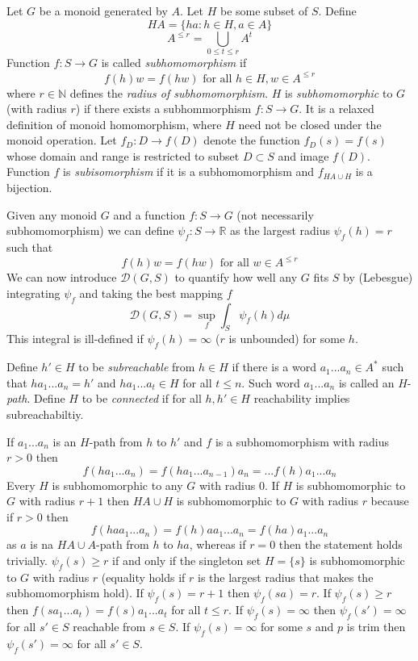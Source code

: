 \documentclass[12pt]{article}
\begin{document}
Let $G$ be a monoid generated by $A$. Let $H$ be some subset of $S$. Define 
\[
HA=\{ha:h\in H, a\in A\}
\]
\[
A^{\le r}=\bigcup_{0 \le t \le r} A^t
\]
Function $f:S \rightarrow G$ is called \textit{subhomomorphism} if 
\[
f(h)w=f(hw)\text{ for all }h\in H, w\in A^{\le r}
\]
where $r\in \mathbb{N}$ defines the \textit{radius of subhomomorphism}.
$H$ is \textit{subhomomorphic} to $G$ (with radius $r$) if there exists a subhommorphism $f:S \rightarrow G$. It is a relaxed definition of monoid homomorphism, where $H$ need not be closed under the monoid operation. Let $f_D:D\rightarrow f(D)$ denote the function $f_D(s)=f(s)$ whose domain and range is restricted to subset $D\subset S$ and image $f(D)$. 
Function $f$ is \textit{subisomorphism} if it is a subhomomorphism and $f_{HA \cup H}$ is a bijection. 


Given any monoid $G$ and a function $f:S\rightarrow G$ (not necessarily subhomomorphism) we can define $\psi_f:S \rightarrow \mathbb{R}$ as the largest radius $\psi_f(h)=r$ such that
\[
f(h)w=f(hw)\text{ for all } w\in A^{\le r}
\]
We can now introduce $\mathcal{D}(G,S)$ to quantify how well any $G$ fits $S$ by (Lebesgue) integrating $\psi_f$ and taking the best mapping $f$
\[
\mathcal{D}(G,S) = \sup_f \int_S \psi_f(h) d \mu
\]
This integral is ill-defined if $\psi_f(h)=\infty$ ($r$ is unbounded) for some $h$.

Define $h'\in H$ to be \textit{subreachable} from $h\in H$ if there is a word $a_1...a_n\in A^*$ such that $ha_1...a_n=h'$ and $ha_1...a_t\in H$ for all $t\le n$. Such word $a_1...a_n$ is called an $H$-\textit{path}. Define $H$ to be \textit{connected} if for all $h,h' \in H$ reachability implies subreachabiltiy.

 
If $a_1...a_n$ is an $H$-path from $h$ to $h'$ and $f$ is a subhomomorphism with radius $r>0$ then \[
	f(ha_1...a_n)=f(ha_1...a_{n-1})a_n=...f(h)a_1...a_n
\]
Every $H$ is subhomomorphic to any $G$ with radius $0$.
If $H$ is subhomomorphic to $G$ with radius $r+1$ then $HA\cup H$ is subhomomorphic to $G$ with radius $r$ because  if $r>0$ then
\[
f(haa_1...a_n)=f(h)aa_1...a_n=f(ha)a_1...a_n
\]
as $a$ is na $HA\cup A$-path from $h$ to $ha$, whereas if $r=0$ then the statement holds trivially.
$\psi_f(s)\ge r$ if and only if the singleton set $H=\{s\}$ is subhomomorphic to $G$ with radius $r$ (equality holds if $r$ is the largest radius that makes the subhomomorphism hold). 
If $\psi_f(s)= r+1$ then $\psi_f(sa)= r$. If $\psi_f(s)\ge r$ then $f(sa_1...a_t)=f(s)a_1...a_t$ for all $t\le r$.
If $\psi_f(s)=\infty$ then $\psi_f(s')=\infty$ for all $s'\in S$ reachable from $s\in S$. If $\psi_f(s)=\infty$ for some $s$ and $p$ is trim then $\psi_f(s')=\infty$ for all $s'\in S$.
\end{document}
